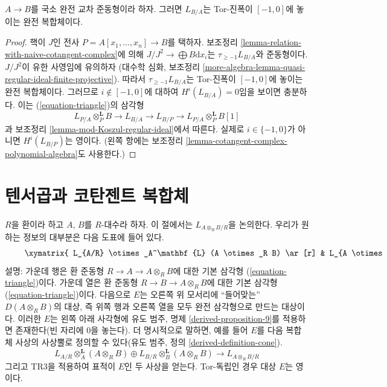 \begin{proposition}
\label{proposition-cotangent-complex-local-complete-intersection}
$A \to B$를 국소 완전 교차 준동형이라 하자. 그러면 $L_{B/A}$는
Tor-진폭이 $[-1, 0]$에 놓이는 완전 복합체이다.
\end{proposition}

\begin{proof}
핵이 $J$인 전사 $P = A[x_1, \ldots, x_n] \to B$를 택하자. 보조정리
\ref{lemma-relation-with-naive-cotangent-complex}에 의해
$J/J^2 \to \bigoplus B\text{d}x_i$는
$\tau_{\geq -1}L_{B/A}$와 준동형이다. $J/J^2$이 유한 사영임에 유의하자
(대수학 심화, 보조정리
\ref{more-algebra-lemma-quasi-regular-ideal-finite-projective}). 따라서
$\tau_{\geq -1}L_{B/A}$는 Tor-진폭이 $[-1, 0]$에 놓이는 완전 복합체이다.
그러므로 $i \not \in [-1, 0]$에 대하여 $H^i(L_{B/A}) = 0$임을 보이면
충분하다. 이는 (\ref{equation-triangle})의 삼각형
$$
L_{P/A} \otimes_P^\mathbf{L} B \to L_{B/A} \to L_{B/P} \to
L_{P/A} \otimes_P^\mathbf{L} B[1]
$$
과 보조정리 \ref{lemma-mod-Koszul-regular-ideal}에서 따른다. 실제로
$i \in \{-1, 0\}$가 아니면 $H^i(L_{B/P})$는 영이다. (왼쪽 항에는
보조정리 \ref{lemma-cotangent-complex-polynomial-algebra}도 사용한다.)
\end{proof}








\section{텐서곱과 코탄젠트 복합체}
\label{section-tensor-product}

\noindent
$R$을 환이라 하고 $A$, $B$를 $R$-대수라 하자. 이 절에서는
$L_{A \otimes_R B/R}$을 논의한다. 우리가 원하는 정보의 대부분은 다음
도표에 들어 있다.
\begin{equation}
\label{equation-tensor-product}
\vcenter{
\xymatrix{
L_{A/R} \otimes_A^\mathbf{L} (A \otimes_R B) \ar[r] &
L_{A \otimes_R B/B} \ar[r] &
E \\
L_{A/R} \otimes_A^\mathbf{L} (A \otimes_R B) \ar[r] \ar@{=}[u] &
L_{A \otimes_R B/R} \ar[r] \ar[u] &
L_{A \otimes_R B/A} \ar[u] \\
 &
L_{B/R} \otimes_B^\mathbf{L} (A \otimes_R B) \ar[u] \ar@{=}[r] &
L_{B/R} \otimes_B^\mathbf{L} (A \otimes_R B) \ar[u]
}
}
\end{equation}
설명: 가운데 행은 환 준동형 $R \to A \to A \otimes_R B$에 대한 기본
삼각형 (\ref{equation-triangle})이다. 가운데 열은 환 준동형
$R \to B \to A \otimes_R B$에 대한 기본 삼각형
(\ref{equation-triangle})이다. 다음으로 $E$는 오른쪽 위 모서리에
``들어맞는'' $D(A \otimes_R B)$의 대상, 즉 위쪽 행과 오른쪽 열을 모두
완전 삼각형으로 만드는 대상이다. 이러한 $E$는 왼쪽 아래 사각형에
유도 범주, 명제 \ref{derived-proposition-9}를 적용하면 존재한다(빈 자리에
$0$을 놓는다). 더 명시적으로 말하면, 예를 들어 $E$를 다음 복합체 사상의
사상뿔로 정의할 수 있다(유도 범주, 정의 \ref{derived-definition-cone}).
$$
L_{A/R} \otimes_A^\mathbf{L} (A \otimes_R B) \oplus
L_{B/R} \otimes_B^\mathbf{L} (A \otimes_R B)
\longrightarrow
L_{A \otimes_R B/R}
$$
그리고 TR3을 적용하여 표적이 $E$인 두 사상을 얻는다. Tor-독립인 경우
대상 $E$는 영이다.

